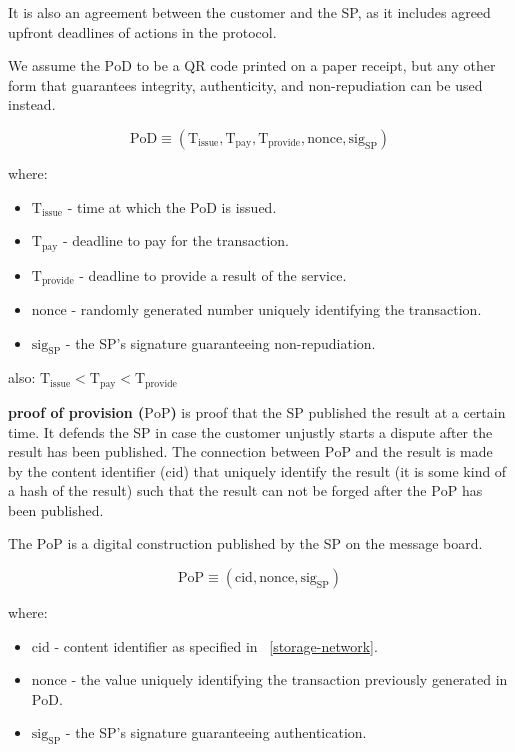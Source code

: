 \documentclass{ieeeaccess}
\begin{document}
It is also an agreement between the customer and the SP, as it includes agreed upfront deadlines of actions in the protocol.

We assume the $\mathrm{PoD}$ to be a QR code printed on a paper receipt, but any other form that guarantees integrity, authenticity, and non-repudiation can be used instead. 

$$\mathrm{PoD} \equiv (\mathrm{T}_\mathrm{issue}, \mathrm{T}_\mathrm{pay}, \mathrm{T}_\mathrm{provide}, \mathrm{nonce}, \mathrm{sig}_\mathrm{SP})$$

where:

\begin{itemize}

\item $\mathrm{T}_\mathrm{issue}$ - time at which the PoD is issued.
\item
  $\mathrm{T}_\mathrm{pay}$ - deadline to pay for the transaction.
\item
  $\mathrm{T}_\mathrm{provide}$ - deadline to provide a result of the service.
\item $\mathrm{nonce}$ - randomly generated number uniquely identifying the transaction.
\item $\mathrm{sig}_\mathrm{SP}$ - the SP's signature guaranteeing non-repudiation.
\end{itemize}

also:
\(\mathrm{T}_\mathrm{issue} < \mathrm{T}_\mathrm{pay} < \mathrm{T}_\mathrm{provide}\)

\noindent \textbf
{proof of provision ($\mathrm{PoP}$)}\label{proof-of-provision} is proof that the SP published the result at a certain time. It defends the SP in case the customer unjustly starts a dispute after the result has been published. The connection between $\mathrm{PoP}$ and the result is made by the content identifier ($\mathrm{cid}$) that uniquely identify the result (it is some kind of a hash of the result) such that the result can not be forged after the $\mathrm{PoP}$ has been published.

The $\mathrm{PoP}$ is a digital construction published by the SP on the message board.

\[\mathrm{PoP} \equiv (\mathrm{cid}, \mathrm{nonce}, \mathrm{sig}_\mathrm{SP})\]

where:

\begin{itemize}

\item
  \(\mathrm{cid}\) - content identifier as specified in ~\ref{storage-network}.
\item
  \(\mathrm{nonce}\) - the value uniquely identifying the transaction previously generated in $\mathrm{PoD}$.
\item
  \(\mathrm{sig}_\mathrm{SP}\) - the SP's signature guaranteeing authentication.
\end{itemize}
\end{document}
